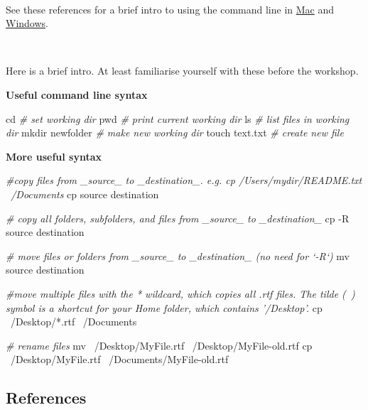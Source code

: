 \documentclass[10,portrait]{article}
\newenvironment{Shaded}{\begin{snugshade}}{\end{snugshade}}
\newcommand{\CommentTok}[1]{\textcolor[rgb]{0.56,0.35,0.01}{\textit{#1}}}
\newcommand{\FunctionTok}[1]{\textcolor[rgb]{0.00,0.00,0.00}{#1}}
\newcommand{\BuiltInTok}[1]{#1}
\newcommand{\NormalTok}[1]{#1}
\begin{document}
~

See these references for a brief intro to using the command line in
\href{https://macpaw.com/how-to/use-terminal-on-mac}{Mac} and
\href{https://www.computerhope.com/issues/chusedos.htm}{Windows}.

~

Here is a brief intro. At least familiarise yourself with these before
the workshop.

\textbf{Useful command line syntax}

\begin{Shaded}
\begin{Highlighting}[]
\BuiltInTok{cd} \CommentTok{# set working dir  }
\BuiltInTok{pwd} \CommentTok{# print current working dir  }
\FunctionTok{ls} \CommentTok{# list files in working dir  }
\FunctionTok{mkdir}\NormalTok{ newfolder }\CommentTok{# make new working dir}
\FunctionTok{touch}\NormalTok{ text.txt }\CommentTok{# create new file }
\end{Highlighting}
\end{Shaded}

\textbf{More useful syntax}

\begin{Shaded}
\begin{Highlighting}[]
\CommentTok{#copy files from _source_ to _destination_. e.g. cp /Users/mydir/README.txt ~/Documents  }
\FunctionTok{cp}\NormalTok{ source destination   }

\CommentTok{# copy all folders, subfolders, and files from _source_ to _destination_  }
\FunctionTok{cp}\NormalTok{ -R source destination  }

\CommentTok{# move files or folders from _source_ to _destination_ (no need for `-R`)  }
\FunctionTok{mv}\NormalTok{ source destination  }

\CommentTok{#move multiple files with the * wildcard, which copies all .rtf files. The tilde (~) symbol is a shortcut for your Home folder, which contains '/Desktop'.}
\FunctionTok{cp}\NormalTok{ ~/Desktop/*.rtf ~/Documents  }

\CommentTok{# rename files }
\FunctionTok{mv}\NormalTok{ ~/Desktop/MyFile.rtf ~/Desktop/MyFile-old.rtf  }
\FunctionTok{cp}\NormalTok{ ~/Desktop/MyFile.rtf ~/Documents/MyFile-old.rtf  }
\end{Highlighting}
\end{Shaded}

\subsection{References}\label{references}
\end{document}
